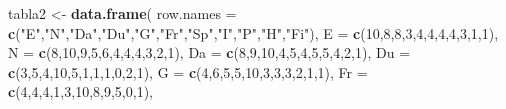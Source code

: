 \documentclass[
]{book}
\newenvironment{Shaded}{\begin{snugshade}}{\end{snugshade}}
\newcommand{\AttributeTok}[1]{\textcolor[rgb]{0.13,0.29,0.53}{#1}}
\newcommand{\DecValTok}[1]{\textcolor[rgb]{0.00,0.00,0.81}{#1}}
\newcommand{\FunctionTok}[1]{\textcolor[rgb]{0.13,0.29,0.53}{\textbf{#1}}}
\newcommand{\NormalTok}[1]{#1}
\newcommand{\OtherTok}[1]{\textcolor[rgb]{0.56,0.35,0.01}{#1}}
\newcommand{\StringTok}[1]{\textcolor[rgb]{0.31,0.60,0.02}{#1}}
\begin{document}
\begin{Shaded}
\begin{Highlighting}[]
\NormalTok{tabla2 }\OtherTok{\textless{}{-}} \FunctionTok{data.frame}\NormalTok{(}
  \AttributeTok{row.names =} \FunctionTok{c}\NormalTok{(}\StringTok{"E"}\NormalTok{,}\StringTok{"N"}\NormalTok{,}\StringTok{"Da"}\NormalTok{,}\StringTok{"Du"}\NormalTok{,}\StringTok{"G"}\NormalTok{,}\StringTok{"Fr"}\NormalTok{,}\StringTok{"Sp"}\NormalTok{,}\StringTok{"I"}\NormalTok{,}\StringTok{"P"}\NormalTok{,}\StringTok{"H"}\NormalTok{,}\StringTok{"Fi"}\NormalTok{),}
  \AttributeTok{E  =} \FunctionTok{c}\NormalTok{(}\DecValTok{10}\NormalTok{,}\DecValTok{8}\NormalTok{,}\DecValTok{8}\NormalTok{,}\DecValTok{3}\NormalTok{,}\DecValTok{4}\NormalTok{,}\DecValTok{4}\NormalTok{,}\DecValTok{4}\NormalTok{,}\DecValTok{4}\NormalTok{,}\DecValTok{3}\NormalTok{,}\DecValTok{1}\NormalTok{,}\DecValTok{1}\NormalTok{),}
  \AttributeTok{N  =} \FunctionTok{c}\NormalTok{(}\DecValTok{8}\NormalTok{,}\DecValTok{10}\NormalTok{,}\DecValTok{9}\NormalTok{,}\DecValTok{5}\NormalTok{,}\DecValTok{6}\NormalTok{,}\DecValTok{4}\NormalTok{,}\DecValTok{4}\NormalTok{,}\DecValTok{4}\NormalTok{,}\DecValTok{3}\NormalTok{,}\DecValTok{2}\NormalTok{,}\DecValTok{1}\NormalTok{),}
  \AttributeTok{Da =} \FunctionTok{c}\NormalTok{(}\DecValTok{8}\NormalTok{,}\DecValTok{9}\NormalTok{,}\DecValTok{10}\NormalTok{,}\DecValTok{4}\NormalTok{,}\DecValTok{5}\NormalTok{,}\DecValTok{4}\NormalTok{,}\DecValTok{5}\NormalTok{,}\DecValTok{5}\NormalTok{,}\DecValTok{4}\NormalTok{,}\DecValTok{2}\NormalTok{,}\DecValTok{1}\NormalTok{),}
  \AttributeTok{Du =} \FunctionTok{c}\NormalTok{(}\DecValTok{3}\NormalTok{,}\DecValTok{5}\NormalTok{,}\DecValTok{4}\NormalTok{,}\DecValTok{10}\NormalTok{,}\DecValTok{5}\NormalTok{,}\DecValTok{1}\NormalTok{,}\DecValTok{1}\NormalTok{,}\DecValTok{1}\NormalTok{,}\DecValTok{0}\NormalTok{,}\DecValTok{2}\NormalTok{,}\DecValTok{1}\NormalTok{),}
  \AttributeTok{G  =} \FunctionTok{c}\NormalTok{(}\DecValTok{4}\NormalTok{,}\DecValTok{6}\NormalTok{,}\DecValTok{5}\NormalTok{,}\DecValTok{5}\NormalTok{,}\DecValTok{10}\NormalTok{,}\DecValTok{3}\NormalTok{,}\DecValTok{3}\NormalTok{,}\DecValTok{3}\NormalTok{,}\DecValTok{2}\NormalTok{,}\DecValTok{1}\NormalTok{,}\DecValTok{1}\NormalTok{),}
  \AttributeTok{Fr =} \FunctionTok{c}\NormalTok{(}\DecValTok{4}\NormalTok{,}\DecValTok{4}\NormalTok{,}\DecValTok{4}\NormalTok{,}\DecValTok{1}\NormalTok{,}\DecValTok{3}\NormalTok{,}\DecValTok{10}\NormalTok{,}\DecValTok{8}\NormalTok{,}\DecValTok{9}\NormalTok{,}\DecValTok{5}\NormalTok{,}\DecValTok{0}\NormalTok{,}\DecValTok{1}\NormalTok{),}

\end{Highlighting}
\end{Shaded}
\end{document}
